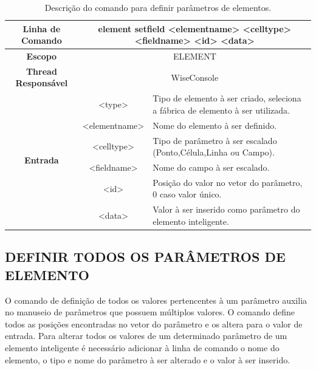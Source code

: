 \begin{center}
	\begin{table}[!htbp]
		\begin{tabular}{|c|c|m{}|}
			\hline
			\textbf{Linha de Comando} & \multicolumn{2}{c|}{element set\underline{\space\space}field <element\underline{\space\space}name> <cell\underline{\space\space}type> <field\underline{\space\space}name> <id> <data>} \\
			\hline
			\textbf{Escopo} & \multicolumn{2}{c|}{ELEMENT} \\
			\hline
			\textbf{Thread Responsável} & \multicolumn{2}{c|}{WiseConsole} \\
			\hline
			\multirow{6}{*}{\textbf{Entrada}} & <type> & Tipo de elemento à ser criado, seleciona a fábrica de elemento à ser utilizada. \\
			
			& <element\underline{\space\space}name> & Nome do elemento à ser definido. \\
			& <cell\underline{\space\space}type> & Tipo de parâmetro à ser escalado (Ponto,Célula,Linha ou Campo). \\
			& <field\underline{\space\space}name> & Nome do campo à ser escalado. \\
			& <id> & Posição do valor no vetor do parâmetro, 0 caso valor único. \\
			& <data> & Valor à ser inserido como parâmetro do elemento inteligente. \\
			\hline
		\end{tabular}
		\caption{Descrição do comando para definir parâmetros de elementos.}
		\label{tab:set_field_element}
	\end{table}
\end{center}

\subsection{DEFINIR TODOS OS PARÂMETROS DE ELEMENTO}\label{sec:set_all_field_element}

O comando de definição de todos os valores pertencentes à um parâmetro auxilia no manuseio de parâmetros que possuem múltiplos valores. O comando define todos as posições encontradas no vetor do parâmetro e os altera para o valor de entrada. Para alterar todos os valores de um determinado parâmetro de um elemento inteligente é necessário adicionar à linha de comando o nome do elemento, o tipo e nome do parâmetro à ser alterado e o valor à ser inserido.

